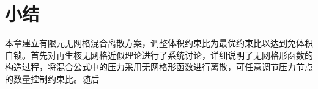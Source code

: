 \section{小结}

本章建立有限元无网格混合离散方案，调整体积约束比为最优约束比以达到免体积自锁。首先对再生核无网格近似理论进行了系统讨论，详细说明了无网格形函数的构造过程，将混合公式中的压力采用无网格形函数进行离散，可任意调节压力节点的数量控制约束比。随后
